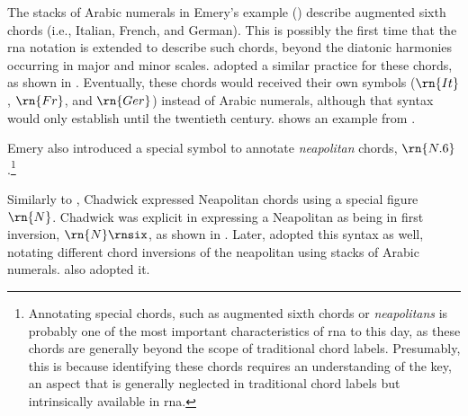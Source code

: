 


The stacks of Arabic numerals in Emery's example
() describe
augmented sixth chords (i.e., Italian, French, and German).
This is possibly the first time that the \gls{rna} notation
is extended to describe such chords, beyond the diatonic
harmonies occurring in major and minor scales.
\textcite{shepard1896harmony} adopted a similar practice for
these chords, as shown in
. Eventually,
these chords would received their own symbols ($\rn{It}$,
$\rn{Fr}$, and $\rn{Ger}$) instead of Arabic numerals,
although that syntax would only establish until the
twentieth century.  shows an
example from \textcite{goldman1965harmony}.



Emery also introduced a special symbol to annotate
\emph{neapolitan} chords, $\rn{N.6}$.\footnote{Annotating
special chords, such as augmented sixth chords or
\emph{neapolitans} is probably one of the most important
characteristics of \gls{rna} to this day, as these chords
are generally beyond the scope of traditional chord labels.
Presumably, this is because identifying these chords
requires an understanding of the key, an aspect that is
generally neglected in traditional chord labels but
intrinsically available in \gls{rna}.}

Similarly to \textcite{emery1879elements}, Chadwick
expressed Neapolitan chords using a special figure $\rn{N}$.
Chadwick was explicit in expressing a Neapolitan as being in
first inversion, $\rn{N}\rnsix$, as shown in
. Later,
\textcite{heacox1907lessons} adopted this syntax as well,
notating different chord inversions of the neapolitan using
stacks of Arabic numerals. \textcite{alchin1921applied} also
adopted it.


